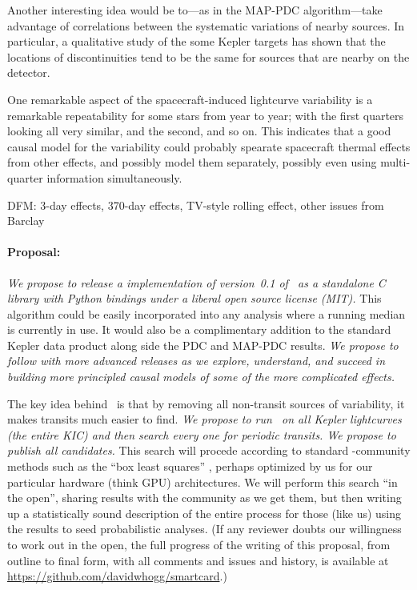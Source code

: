 \documentclass[letterpaper,12pt,preprint]{hack_aastex}
\newcommand{\Untrendy}{\package{Untrendy}}
\begin{document}
Another interesting idea would be to---as in the MAP-PDC algorithm---take
advantage of correlations between the systematic variations of nearby sources.
In particular, a qualitative study of the some Kepler targets has shown that
the locations of discontinuities tend to be the same for sources that are
nearby on the detector.

One remarkable aspect of the spacecraft-induced lightcurve variability is
a remarkable repeatability for some stars from year to year; with the
first quarters looking all very similar, and the second, and so on.
This indicates that a good causal model for the variability could probably
spearate spacecraft thermal effects from other effects, and possibly model
them separately, possibly even using multi-quarter information simultaneously.

DFM:  3-day effects,  370-day effects,  TV-style rolling effect,  other issues from Barclay

\paragraph{Proposal:}
\emph{We propose to release a implementation of version~0.1 of \Untrendy\ as a standalone C
library with Python bindings under a liberal open source license (MIT).}
This algorithm could be easily incorporated into any analysis where a running
median is currently in use.
It would also be a complimentary addition to the standard Kepler data
product along side the PDC and MAP-PDC results.
\emph{We propose to follow with more advanced releases as we explore,
understand, and succeed in building more principled causal models of some
of the more complicated effects.}

The key idea behind \Untrendy\ is that by removing all non-transit
sources of variability, it makes transits much easier to find.
\emph{We propose to run \Untrendy\ on all Kepler lightcurves (the
  entire KIC) and then search every one for periodic transits.  We
  propose to publish all candidates.}
This search will procede
according to standard \Kepler-community methods such as the ``box
least squares'' \citep{box}, perhaps optimized by us for our particular
hardware (think GPU) architectures.
We will perform this search ``in
the open'', sharing results with the community as we get them, but
then writing up a statistically sound description of the entire
process for those (like us) using the results to seed probabilistic
analyses.
(If any reviewer doubts our willingness to work out in the open, the
full progress of the writing of this proposal, from outline to final
form, with all comments and issues and history, is available at
\url{https://github.com/davidwhogg/smartcard}.)
\end{document}
